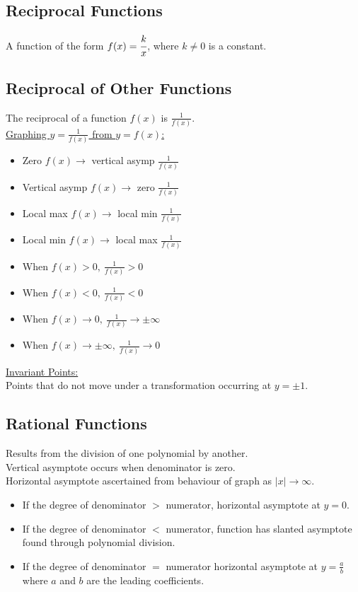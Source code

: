 \documentclass[10pt, a4paper, titlepage]{article}
\begin{document}
\begin{multicols*}{3}
	\dotfill
	\subsection{Reciprocal Functions}
	A function of the form $f(x)=\cfrac{k}{x}$, where $k\neq 0$ is a constant.

	\dotfill
	\subsection{Reciprocal of Other Functions}
	The reciprocal of a function $f(x)$ is $\frac{1}{f(x)}$.\\
	\underline{Graphing $y=\frac{1}{f(x)}$ from $y=f(x)$:}
	\begin{itemize}
		\item Zero $f(x)\to$ vertical asymp $\frac{1}{f(x)}$
		\item Vertical asymp $f(x)\to$ zero $\frac{1}{f(x)}$
		\item Local max $f(x)\to$ local min $\frac{1}{f(x)}$
		\item Local min $f(x)\to$ local max $\frac{1}{f(x)}$
		\item When $f(x)>0,\ \frac{1}{f(x)}>0$
		\item When $f(x)<0,\ \frac{1}{f(x)}<0$
		\item When $f(x)\to 0,\ \frac{1}{f(x)}\to \pm \infty$
		\item When $f(x)\to \pm \infty,\ \frac{1}{f(x)}\to 0$
	\end{itemize}
	\underline{Invariant Points:}
	\\Points that do not move under a transformation occurring at $y=\pm 1$.

	\dotfill
	\subsection{Rational Functions}
	Results from the division of one polynomial by another.\\
	Vertical asymptote occurs when denominator is zero.\\
	Horizontal asymptote ascertained from behaviour of graph as $|x|\to \infty$.
	\begin{itemize}
		\item If the degree of denominator $>$ numerator, horizontal asymptote at $y=0$.
		\item If the degree of denominator $<$ numerator, function has slanted asymptote found through polynomial division.
		\item If the degree of denominator $=$ numerator horizontal asymptote at $y=\frac{a}{b}$ where $a$ and $b$ are the leading coefficients.
	\end{itemize}


\end{multicols*}
\end{document}
